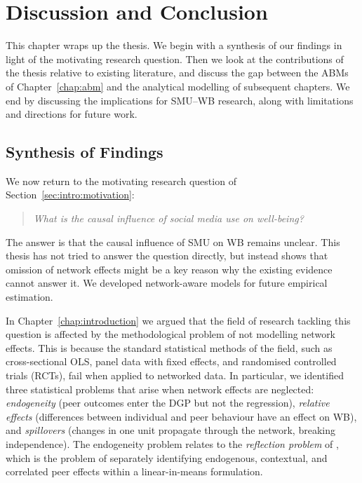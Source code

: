 
\chapter{Discussion and Conclusion}
\label{chap:discussion_conclusion}
This chapter wraps up the thesis. We begin with a synthesis of our findings in light of the motivating research question. Then we look at the contributions of the thesis relative to existing literature, and discuss the gap between the ABMs of Chapter~\ref{chap:abm} and the analytical modelling of subsequent chapters. We end by discussing the implications for SMU--WB research, along with limitations and directions for future work.

\section{Synthesis of Findings}
\label{sec:discussion_conclusion:synthesis}
We now return to the motivating research question of Section~\ref{sec:intro:motivation}:
\begin{quote}
\emph{What is the causal influence of social media use on well-being?}
\end{quote}

The answer is that the causal influence of SMU on WB remains unclear. This thesis has not tried to answer the question directly, but instead shows that omission of network effects might be a key reason why the existing evidence cannot answer it. We developed network-aware models for future empirical estimation.

In Chapter~\ref{chap:introduction} we argued that the field of research tackling this question is affected by the methodological problem of not modelling network effects. This is because the standard statistical methods of the field, such as cross-sectional OLS, panel data with fixed effects, and randomised controlled trials (RCTs), fail when applied to networked data. In particular, we identified three statistical problems that arise when network effects are neglected: \emph{endogeneity} (peer outcomes enter the DGP but not the regression), \emph{relative effects} (differences between individual and peer behaviour have an effect on WB), and \emph{spillovers} (changes in one unit propagate through the network, breaking independence). The endogeneity problem relates to the \emph{reflection problem} of \textcite[Sec.~2]{Manski1993}, which is the problem of separately identifying endogenous, contextual, and correlated peer effects within a linear-in-means formulation.

